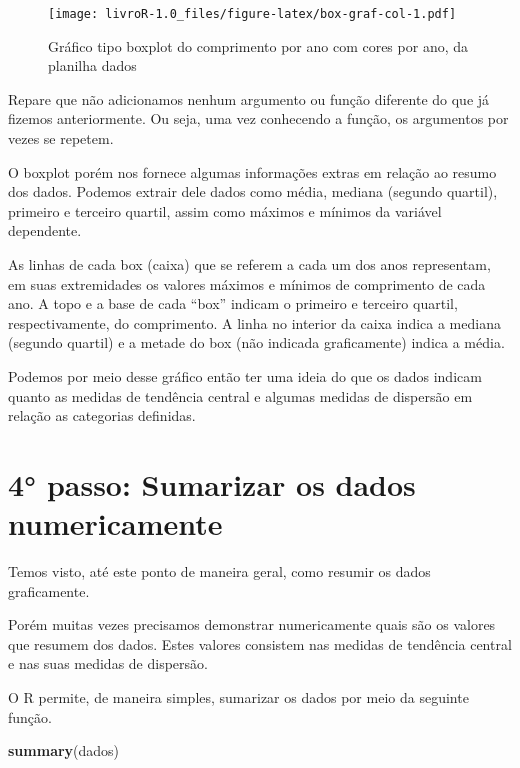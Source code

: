 \documentclass[titlepage, oneside, openany, a4paper]{book}
\newenvironment{Shaded}{\begin{snugshade}}{\end{snugshade}}
\newcommand{\KeywordTok}[1]{\textcolor[rgb]{0.13,0.29,0.53}{\textbf{#1}}}
\newcommand{\NormalTok}[1]{#1}
\begin{document}
\begin{figure}
\centering
\texttt{[image: livroR-1.0\_files/figure-latex/box-graf-col-1.pdf]}
\caption{\label{fig:box-graf-col}Gráfico tipo boxplot do comprimento por ano com cores por ano, da planilha dados}
\end{figure}

Repare que não adicionamos nenhum argumento ou função diferente do que já fizemos anteriormente. Ou seja, uma vez conhecendo a função, os argumentos por vezes se repetem.

O boxplot porém nos fornece algumas informações extras em relação ao resumo dos dados. Podemos extrair dele dados como média, mediana (segundo quartil), primeiro e terceiro quartil, assim como máximos e mínimos da variável dependente.

As linhas de cada box (caixa) que se referem a cada um dos anos representam, em suas extremidades os valores máximos e mínimos de comprimento de cada ano. A topo e a base de cada ``box'' indicam o primeiro e terceiro quartil, respectivamente, do comprimento. A linha no interior da caixa indica a mediana (segundo quartil) e a metade do box (não indicada graficamente) indica a média.

Podemos por meio desse gráfico então ter uma ideia do que os dados indicam quanto as medidas de tendência central e algumas medidas de dispersão em relação as categorias definidas.

\hypertarget{passo-sumarizar-os-dados-numericamente}{%
\section{4° passo: Sumarizar os dados numericamente}\label{passo-sumarizar-os-dados-numericamente}}

Temos visto, até este ponto de maneira geral, como resumir os dados graficamente.

Porém muitas vezes precisamos demonstrar numericamente quais são os valores que resumem dos dados. Estes valores consistem nas medidas de tendência central e nas suas medidas de dispersão.

O R permite, de maneira simples, sumarizar os dados por meio da seguinte função.

\begin{Shaded}
\begin{Highlighting}[]
\KeywordTok{summary}\NormalTok{(dados)}
\end{Highlighting}
\end{Shaded}
\end{document}
